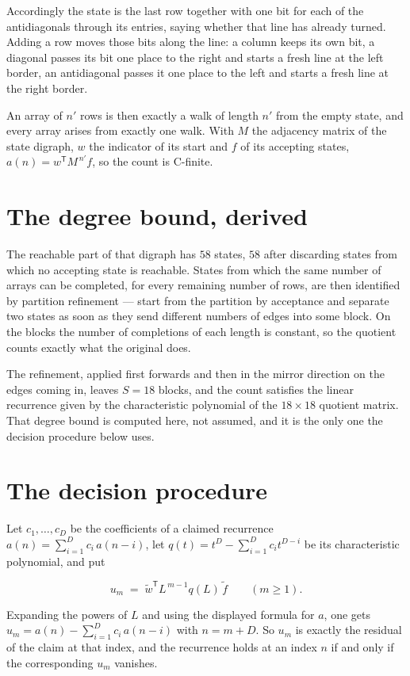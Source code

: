 \documentclass[11pt]{article}
\theoremstyle{definition}
\begin{document}
Accordingly the state is the last row together with one bit for each of the antidiagonals through its entries, saying whether that line has already turned. Adding a row moves those bits along the line: a column keeps its own bit, a diagonal passes its bit one place to the right and starts a fresh line at the left border, an antidiagonal passes it one place to the left and starts a fresh line at the right border.

An array of $n'$ rows is then exactly a walk of length $n'$ from the empty state, and every array arises from exactly one walk. With $M$ the adjacency matrix of the state digraph, $w$ the indicator of its start and $f$ of its accepting states, $a(n) = w^{\mathsf T}M^{\,n'}f$, so the count is C-finite.

\section{The degree bound, derived}

The reachable part of that digraph has $58$ states, $58$ after discarding states from which no accepting state is reachable. States from which the same number of arrays can be completed, for every remaining number of rows, are then identified by partition refinement --- start from the partition by acceptance and separate two states as soon as they send different numbers of edges into some block. On the blocks the number of completions of each length is constant, so the quotient counts exactly what the original does.

The refinement, applied first forwards and then in the mirror direction on the edges coming in, leaves $S = 18$ blocks, and the count satisfies the linear recurrence given by the characteristic polynomial of the $18 \times 18$ quotient matrix. That degree bound is computed here, not assumed, and it is the only one the decision procedure below uses.

\section{The decision procedure}

Let $c_1,\dots,c_D$ be the coefficients of a claimed recurrence $a(n) = \sum_{i=1}^{D} c_i\,a(n-i)$, let $q(t) = t^{D} - \sum_{i=1}^{D} c_i t^{D-i}$ be its characteristic polynomial, and put

\[u_m \;=\; \tilde w^{\mathsf T} L^{\,m-1} q(L)\,\tilde f \qquad (m \ge 1).\]

Expanding the powers of $L$ and using the displayed formula for $a$, one gets $u_m = a(n) - \sum_{i=1}^{D} c_i\,a(n-i)$ with $n = m + D$. So $u_m$ is exactly the residual of the claim at that index, and the recurrence holds at an index $n$ if and only if the corresponding $u_m$ vanishes.
\end{document}
